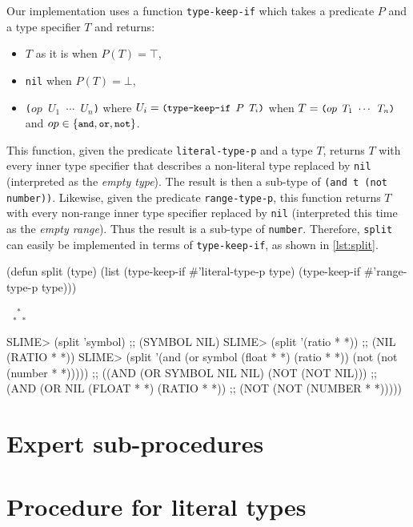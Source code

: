 \documentclass[format=sigconf]{acmart}
\newcommand\asterism{\medskip\noindent\textcolor{black!65}{\small\centerline{$\phantom{x}_{*\,\,\,*}^{\,\,\,*}$}}\smallskip}
\newcommand\code[2][\small]{\sloppy\texttt{#1#2}}
\theoremstyle{definition}
\begin{document}
Our implementation uses a function \code{type-keep-if} which takes a predicate
$P$ and a type specifier $T$ and returns:
\begin{itemize}
  \newcommand\mcode[1]{\text{\code{#1}}}
\item $T$ as it is when $P(T) = \top$,
\item \code{nil} when $P(T) = \bot$,
\item \code{($op$ $U_1$ $\cdots$ $U_n$)}
  where \(U_i = \mcode{(type-keep-if $P$ $T_i$)}\)
  when \(T = \mcode{($op$ $T_1$ $\cdots$ $T_n$)}\)
  and $op \in \{\mcode{and}, \mcode{or}, \mcode{not}\}$.
\end{itemize}
This function, given the predicate \code{literal-type-p} and a type $T$, returns
$T$ with every inner type specifier that describes a non-literal type
replaced by \code{nil} (interpreted as the \textit{empty type}). The result is then a
sub-type of \code{(and t (not number))}.
Likewise, given the predicate \code{range-type-p}, this function returns $T$
with every non-range inner type specifier replaced by \code{nil} (interpreted
this time as the \textit{empty range}). Thus the result is a sub-type of \code{number}.
Therefore, \code{split} can easily be implemented in terms of
\code{type-keep-if}, as shown in \vref{lst:split}.

\begin{listing}
\begin{clcode}
(defun split (type)
  (list (type-keep-if #'literal-type-p type)
        (type-keep-if #'range-type-p type)))
\end{clcode}
\asterism
\begin{clcode}
SLIME> (split 'symbol)
;; (SYMBOL NIL)
SLIME> (split '(ratio * *))
;; (NIL (RATIO * *))
SLIME> (split  '(and (or symbol (float * *) (ratio * *))
                     (not (not (number * *)))))
;; ((AND (OR SYMBOL NIL NIL) (NOT (NOT NIL)))
;;  (AND (OR NIL (FLOAT * *) (RATIO * *))
;;       (NOT (NOT (NUMBER * *)))))
\end{clcode}
\caption{The \code{split} function}
\label{lst:split}
\end{listing}


\section{Expert sub-procedures}
\label{sec:exp}

\section{Procedure for literal types}
\end{document}
